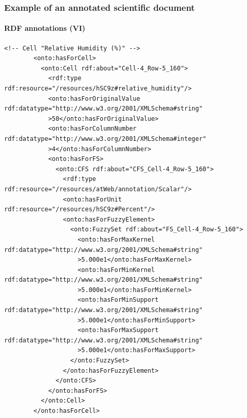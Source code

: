 \documentclass{beamer}
\begin{document}
\begin{frame}[fragile]
  \frametitle{Example of an annotated scientific document}
  \framesubtitle{RDF annotations (VI)}

  \begin{Verbatim}[fontsize=\tiny]
        <!-- Cell "Relative Humidity (%)" -->
        <onto:hasForCell>
          <onto:Cell rdf:about="Cell-4_Row-5_160">
            <rdf:type rdf:resource="/resources/hSC9z#relative_humidity"/>
            <onto:hasForOriginalValue rdf:datatype="http://www.w3.org/2001/XMLSchema#string"
            >50</onto:hasForOriginalValue>
            <onto:hasForColumnNumber rdf:datatype="http://www.w3.org/2001/XMLSchema#integer"
            >4</onto:hasForColumnNumber>
            <onto:hasForFS>
              <onto:CFS rdf:about="CFS_Cell-4_Row-5_160">
                <rdf:type rdf:resource="/resources/atWeb/annotation/Scalar"/>
                <onto:hasForUnit rdf:resource="/resources/hSC9z#Percent"/>
                <onto:hasForFuzzyElement>
                  <onto:FuzzySet rdf:about="FS_Cell-4_Row-5_160">
                    <onto:hasForMaxKernel rdf:datatype="http://www.w3.org/2001/XMLSchema#string"
                    >5.000e1</onto:hasForMaxKernel>
                    <onto:hasForMinKernel rdf:datatype="http://www.w3.org/2001/XMLSchema#string"
                    >5.000e1</onto:hasForMinKernel>
                    <onto:hasForMinSupport rdf:datatype="http://www.w3.org/2001/XMLSchema#string"
                    >5.000e1</onto:hasForMinSupport>
                    <onto:hasForMaxSupport rdf:datatype="http://www.w3.org/2001/XMLSchema#string"
                    >5.000e1</onto:hasForMaxSupport>
                  </onto:FuzzySet>
                </onto:hasForFuzzyElement>
              </onto:CFS>
            </onto:hasForFS>
          </onto:Cell>
        </onto:hasForCell>
  \end{Verbatim}
\end{frame}
\end{document}

